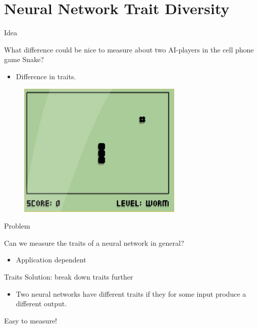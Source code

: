 \section{Neural Network Trait Diversity}
\begin{frame}{Idea}
\begin{center}
  What difference could be nice to measure about two AI-players in the cell phone game Snake?
  \begin{itemize}
  \item Difference in traits.
  \end{itemize}
  \begin{figure}[p]
  \includegraphics[width=0.7\textwidth]{images/snake.jpg}
  \end{figure}
  \end{center}
\end{frame}

\begin{frame}{Problem}
\begin{center}
	Can we measure the traits of a neural network in general?
	\begin{itemize}
	\item Application dependent
	\end{itemize}
\end{center}
\end{frame}

\begin{frame}{Traits}
  Solution: break down traits further
  \begin{itemize}
	\item Two neural networks have different traits if they for some input produce a different output.
  \end{itemize}
      \vspace{30pt}
  Easy to measure!
\end{frame}

